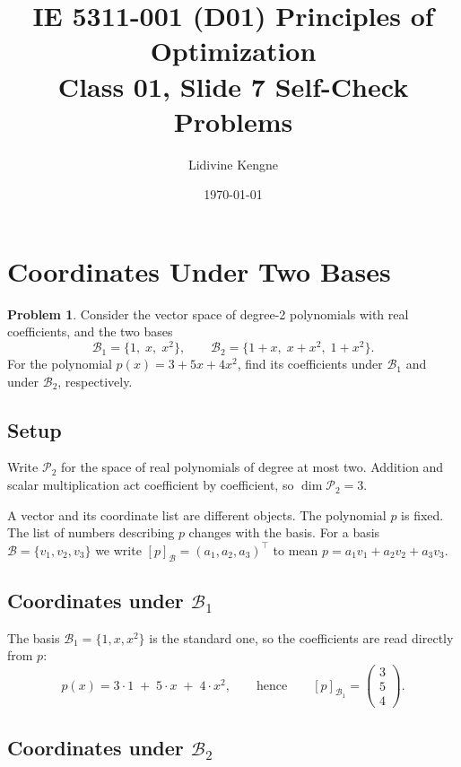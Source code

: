 \documentclass[11pt]{article}
\title{IE 5311-001 (D01) Principles of Optimization\\[2pt]
       \large Class 01, Slide 7 Self-Check Problems}
\author{Lidivine Kengne}
\date{\today}
\theoremstyle{definition}
\newtheorem{problem}{Problem}
\begin{document}
\maketitle

\section{Coordinates Under Two Bases}

\begin{problem}
Consider the vector space of degree-2 polynomials with real coefficients,
and the two bases
\[
  \mathcal{B}_1 = \{1,\; x,\; x^2\},
  \qquad
  \mathcal{B}_2 = \{1+x,\; x+x^2,\; 1+x^2\}.
\]
For the polynomial $p(x) = 3 + 5x + 4x^2$, find its coefficients under
$\mathcal{B}_1$ and under $\mathcal{B}_2$, respectively.
\end{problem}

\subsection*{Setup}

Write $\mathcal{P}_2$ for the space of real polynomials of degree at most
two. Addition and scalar multiplication act coefficient by coefficient,
so $\dim \mathcal{P}_2 = 3$.

A vector and its coordinate list are different objects. The polynomial
$p$ is fixed. The list of numbers describing $p$ changes with the basis.
For a basis $\mathcal{B} = \{v_1, v_2, v_3\}$ we write
$[p]_{\mathcal{B}} = (a_1, a_2, a_3)^{\top}$ to mean
$p = a_1 v_1 + a_2 v_2 + a_3 v_3$.

\subsection*{Coordinates under $\mathcal{B}_1$}

The basis $\mathcal{B}_1 = \{1, x, x^2\}$ is the standard one, so the
coefficients are read directly from $p$:
\[
  p(x) = 3 \cdot 1 \;+\; 5 \cdot x \;+\; 4 \cdot x^2,
  \qquad\text{hence}\qquad
  [p]_{\mathcal{B}_1} = \begin{pmatrix} 3 \\ 5 \\ 4 \end{pmatrix}.
\]

\subsection*{Coordinates under $\mathcal{B}_2$}
\end{document}
